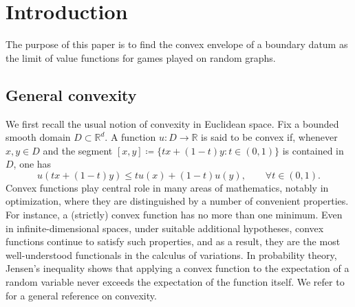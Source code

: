 \documentclass[11pt]{amsart}
\theoremstyle{definition}
\theoremstyle{remark}
\numberwithin{equation}{section}
\begin{document}
\maketitle
	

	
	
\section{Introduction}

The purpose of this paper is to find the convex
envelope of a boundary datum as the limit of value functions for games played on random graphs.
	
	
\subsection{General convexity} We first recall the usual notion of convexity in Euclidean space. 
	Fix a bounded smooth domain $D \subset {\mathbb{R}}^d$.
	A function $u\colon D \to  {\mathbb{R}}$ is said to be convex if, whenever $x,y \in D$ and the segment $[x,y]\coloneqq \{tx+(1-t)y: t \in (0,1)\}$ is contained in $D$, one has
	\begin{equation} \label{convexo-usual}
		u(tx+(1-t)y) \leq tu(x) + (1-t) u(y), \qquad \forall t \in (0,1).
	\end{equation}
		Convex functions play central role in many areas of mathematics, notably in optimization, where they are distinguished by a number of convenient properties. 
		For instance, a (strictly) convex function has no more than one minimum. Even in infinite-dimensional spaces, under suitable additional hypotheses, convex functions continue to satisfy such properties, and as a result, they are the most well-understood functionals in the calculus of variations. In probability theory, Jensen’s inequality shows that applying a convex function to the expectation of a random variable never exceeds the expectation of the function itself. We refer to \cite{Vel} for a general reference on convexity.
\end{document}
